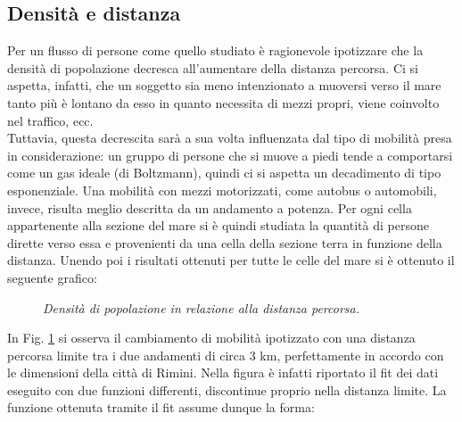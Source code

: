 \documentclass[12pt,a4paper]{article}
\begin{document}
\subsection{Densità e distanza}
Per un flusso di persone come quello studiato è ragionevole ipotizzare che la densità di popolazione decresca all'aumentare della distanza percorsa.
Ci si aspetta, infatti, che un soggetto sia meno intenzionato a muoversi verso il mare tanto più è lontano da esso in quanto necessita di mezzi propri, viene coinvolto nel traffico, ecc.\\
Tuttavia, questa decrescita sarà a sua volta influenzata dal tipo di mobilità presa in considerazione: un gruppo di persone che si muove a piedi tende a comportarsi come un gas ideale (di Boltzmann), quindi ci si aspetta un decadimento di tipo esponenziale.
Una mobilità con mezzi motorizzati, come autobus o automobili, invece, risulta meglio descritta da un andamento a potenza.
Per ogni cella appartenente alla sezione del mare si è quindi studiata la quantità di persone dirette verso essa e provenienti da una cella della sezione terra in funzione della distanza.
Unendo poi i risultati ottenuti per tutte le celle del mare si è ottenuto il seguente grafico:
\begin{figure}[H]
\centering
{}
\caption{\emph{Densità di popolazione in relazione alla distanza percorsa.}}
\label{figure:dens_dist}
\end{figure}
In Fig. \ref{figure:dens_dist} si osserva il cambiamento di mobilità ipotizzato con una distanza percorsa limite tra i due andamenti di circa $3$ km, perfettamente in accordo con le dimensioni della città di Rimini.
Nella figura è infatti riportato il fit dei dati eseguito con due funzioni differenti, discontinue proprio nella distanza limite.
La funzione ottenuta tramite il fit assume dunque la forma:      
\end{document}
